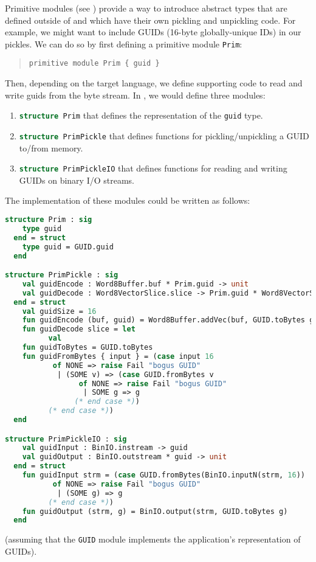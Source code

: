 Primitive modules (see ) provide a way to introduce abstract
types that are defined outside
of \asdl{} and which have their own pickling and unpickling code.
For example, we might want to include GUIDs (16-byte globally-unique IDs) in our pickles.
We can do so by first defining a primitive module \lstinline!Prim!:
%
\begin{quote}\begin{lstlisting}[language=ASDL]
primitive module Prim { guid }
\end{lstlisting}\end{quote}%
%
Then, depending on the target language, we define
supporting code to read and write guids from the byte stream.
In \sml{}, we would define three modules:
\begin{enumerate}
  \item \lstinline[language=SML]!structure Prim! that defines the representation of the
    \lstinline[language=SML]!guid! type.
  \item
    \lstinline[language=SML]!structure PrimPickle! that defines functions for pickling/unpickling
    a GUID to/from memory.
  \item
    \lstinline[language=SML]!structure PrimPickleIO! that defines functions for reading
    and writing GUIDs on binary I/O streams.
\end{enumerate}%
The \sml{} implementation of these modules could be written as follows:
\begin{code}\begin{lstlisting}[language=SML]
structure Prim : sig
    type guid
  end = struct
    type guid = GUID.guid
  end

structure PrimPickle : sig
    val guidEncode : Word8Buffer.buf * Prim.guid -> unit
    val guidDecode : Word8VectorSlice.slice -> Prim.guid * Word8VectorSlice.slice
  end = struct
    val guidSize = 16
    fun guidEncode (buf, guid) = Word8Buffer.addVec(buf, GUID.toBytes guid)
    fun guidDecode slice = let
    	  val 
    fun guidToBytes = GUID.toBytes
    fun guidFromBytes { input } = (case input 16
           of NONE => raise Fail "bogus GUID"
	        | (SOME v) => (case GUID.fromBytes v
                 of NONE => raise Fail "bogus GUID"
	              | SOME g => g
                (* end case *))
	      (* end case *))
  end

structure PrimPickleIO : sig
    val guidInput : BinIO.instream -> guid
    val guidOutput : BinIO.outstream * guid -> unit
  end = struct
    fun guidInput strm = (case GUID.fromBytes(BinIO.inputN(strm, 16))
	       of NONE => raise Fail "bogus GUID"
	        | (SOME g) => g
	      (* end case *))
    fun guidOutput (strm, g) = BinIO.output(strm, GUID.toBytes g)
  end
\end{lstlisting}\end{code}%
(assuming that the \lstinline!GUID! module implements the application's representation
of GUIDs).

